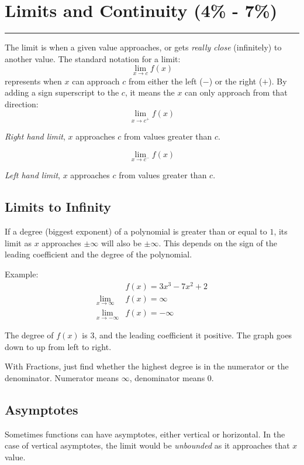 \documentclass[12pt]{article}
\begin{document}
    \section{Limits and Continuity (4\% - 7\%)}
    \par\noindent\rule{\textwidth}{0.1pt}
        \indent The limit is when a given value approaches, or gets \textit{really close} (infinitely) to another value. The standard notation for a limit:
        \[ \lim_{x \to c} f(x) \]
        represents when $x$ can approach $c$ from either the left ($-$) or the right ($+$). By adding a sign superscript to the $c$, it means the $x$ can only approach from that direction:
        \[ \lim_{x \to c^+} f(x) \]
        \begin{center}
            \textit{Right hand limit}, $x$ approaches $c$ from values greater than $c$.
        \end{center}
        \[ \lim_{x \to c^-} f(x) \]
        \begin{center}
            \textit{Left hand limit}, $x$ approaches $c$ from values greater than $c$.
        \end{center}

        \subsection{Limits to Infinity}
            \par If a degree (biggest exponent) of a polynomial is greater than or equal to $1$, its limit as $x$ approaches $\pm\infty$ will also be $\pm\infty$. This depends on the sign of the leading coefficient and the degree of the polynomial.

            \noindent Example:
            \begin{align*}
                &f(x) = 3x^3 - 7x^2 + 2 \\
                \lim_{x \to \infty} &f(x) = \infty \\
                \lim_{x \to -\infty} &f(x) = -\infty
            \end{align*}

            The degree of $f(x)$ is $3$, and the leading coefficient it positive. The graph goes down to up from left to right.

            With Fractions, just find whether the highest degree is in the numerator or the denominator. Numerator means $\infty$, denominator means $0$.

        \subsection{Asymptotes}
            Sometimes functions can have asymptotes, either vertical or horizontal. In the case of vertical asymptotes, the limit would be \textit{unbounded} as it approaches that $x$ value.
\end{document}
